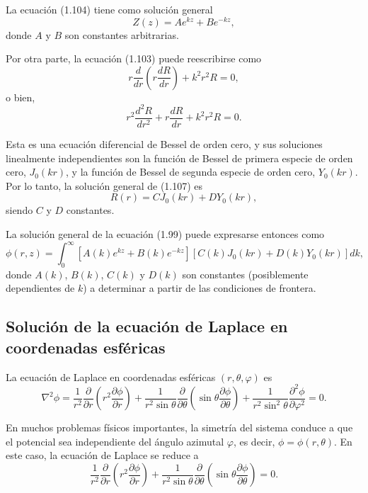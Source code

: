 \documentclass[12pt,a4paper]{book}
\begin{document}
La ecuación (1.104) tiene como solución general
\begin{equation}
Z(z) = Ae^{kz} + Be^{-kz},
\end{equation}
donde $A$ y $B$ son constantes arbitrarias.

Por otra parte, la ecuación (1.103) puede reescribirse como
\begin{equation}
r\frac{d}{dr}\left(r\frac{dR}{dr}\right) + k^2r^2R = 0,
\end{equation}
o bien,
\begin{equation}
r^2\frac{d^2R}{dr^2} + r\frac{dR}{dr} + k^2r^2R = 0.
\end{equation}

Esta es una ecuación diferencial de Bessel de orden cero, y sus soluciones linealmente independientes son la función de Bessel de primera especie de orden cero, $J_0(kr)$, y la función de Bessel de segunda especie de orden cero, $Y_0(kr)$. Por lo tanto, la solución general de (1.107) es
\begin{equation}
R(r) = CJ_0(kr) + DY_0(kr),
\end{equation}
siendo $C$ y $D$ constantes.

La solución general de la ecuación (1.99) puede expresarse entonces como
\begin{equation}
\phi(r, z) = \int_{0}^{\infty} \left[A(k)e^{kz} + B(k)e^{-kz}\right]\left[C(k)J_0(kr) + D(k)Y_0(kr)\right]dk,
\end{equation}
donde $A(k)$, $B(k)$, $C(k)$ y $D(k)$ son constantes (posiblemente dependientes de $k$) a determinar a partir de las condiciones de frontera.

\subsection{Solución de la ecuación de Laplace en coordenadas esféricas}

La ecuación de Laplace en coordenadas esféricas $(r, \theta, \varphi)$ es
\begin{equation}
\nabla^2\phi = \frac{1}{r^2}\frac{\partial}{\partial r}\left(r^2\frac{\partial \phi}{\partial r}\right) + \frac{1}{r^2\sin\theta}\frac{\partial}{\partial\theta}\left(\sin\theta\frac{\partial\phi}{\partial\theta}\right) + \frac{1}{r^2\sin^2\theta}\frac{\partial^2\phi}{\partial\varphi^2} = 0.
\end{equation}

En muchos problemas físicos importantes, la simetría del sistema conduce a que el potencial sea independiente del ángulo azimutal $\varphi$, es decir, $\phi = \phi(r, \theta)$. En este caso, la ecuación de Laplace se reduce a
\begin{equation}
\frac{1}{r^2}\frac{\partial}{\partial r}\left(r^2\frac{\partial \phi}{\partial r}\right) + \frac{1}{r^2\sin\theta}\frac{\partial}{\partial\theta}\left(\sin\theta\frac{\partial\phi}{\partial\theta}\right) = 0.
\end{equation}
\end{document}
